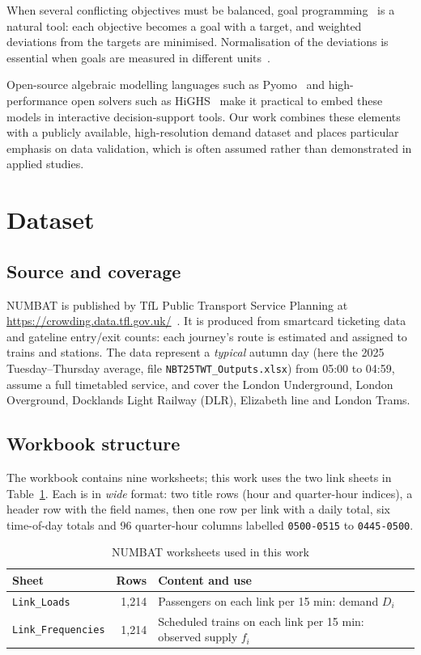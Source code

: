 \documentclass[conference]{IEEEtran}
\begin{document}
When several conflicting objectives must be balanced, goal programming~\cite{charnes1961,tamiz1998,jones2010} is a
natural tool: each objective becomes a goal with a target, and weighted deviations from the targets are minimised.
Normalisation of the deviations is essential when goals are measured in different units~\cite{tamiz1998,jones2010}.

Open-source algebraic modelling languages such as Pyomo~\cite{hart2011,bynum2021} and high-performance open solvers
such as HiGHS~\cite{huangfu2018} make it practical to embed these models in interactive decision-support tools. Our
work combines these elements with a publicly available, high-resolution demand dataset and places particular emphasis
on data validation, which is often assumed rather than demonstrated in applied studies.

\section{Dataset}\label{sec:data}
\subsection{Source and coverage}
NUMBAT is published by TfL Public Transport Service Planning at \url{https://crowding.data.tfl.gov.uk/}~\cite{tfl_numbat}.
It is produced from smartcard ticketing data and gateline entry/exit counts: each journey's route is estimated and
assigned to trains and stations. The data represent a \emph{typical} autumn day (here the 2025 Tuesday--Thursday
average, file \texttt{NBT25TWT\_Outputs.xlsx}) from 05:00 to 04:59, assume a full timetabled service, and cover the
London Underground, London Overground, Docklands Light Railway (DLR), Elizabeth line and London Trams.

\subsection{Workbook structure}
The workbook contains nine worksheets; this work uses the two link sheets in Table~\ref{tab:sheets}. Each is in
\emph{wide} format: two title rows (hour and quarter-hour indices), a header row with the field names, then one row
per link with a daily total, six time-of-day totals and 96 quarter-hour columns labelled \texttt{0500-0515} to
\texttt{0445-0500}.

\begin{table}[!t]
\caption{NUMBAT worksheets used in this work}\label{tab:sheets}
\centering\footnotesize
\begin{tabularx}{\columnwidth}{@{}l r X@{}}
\toprule
Sheet & Rows & Content and use \\
\midrule
\texttt{Link\_Loads} & 1{,}214 & Passengers on each link per 15 min: demand $D_i$ \\
\texttt{Link\_Frequencies} & 1{,}214 & Scheduled trains on each link per 15 min: observed supply $f_i$ \\
\bottomrule
\end{tabularx}
\end{table}
\end{document}
